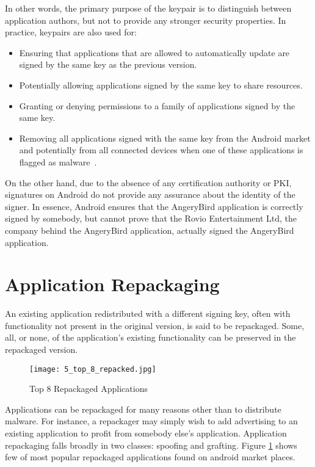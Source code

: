 In other words, the primary purpose of the keypair is to distinguish between application authors, but not to provide any stronger security properties. In practice, keypairs are also used for:
\begin{itemize}
\item Ensuring that applications that are allowed to automatically update are signed by the same key as the previous version.
\item Potentially allowing applications signed by the same key to share resources.
\item Granting or denying permissions to a family of applications signed by the same key.
\item Removing all applications signed with the same key from the Android market and potentially from all connected devices when one of these applications is flagged as malware~\cite{57}.
\end{itemize}

On the other hand, due to the absence of any certification authority or PKI, signatures on Android do not provide any assurance about the identity of the signer. In essence, Android ensures that the AngeryBird application is correctly signed by somebody, but cannot prove that the Rovio Entertainment Ltd, the company behind the AngeryBird application, actually signed the AngeryBird application.

\section{Application Repackaging}
\label{Application Repackaging}
An existing application redistributed with a different signing key, often with functionality not present in the original version, is said to be repackaged. Some, all, or none, of the application's existing functionality can be preserved in the repackaged version.

\begin{figure}[h]
\centering
\texttt{[image: 5\_top\_8\_repacked.jpg]}
\caption{Top 8 Repackaged Applications}
\label{fig:5_top_8_repacked}
\end{figure}

Applications can be repackaged for many reasons other than to distribute malware. For instance, a repackager may simply wish to
add advertising to an existing application to profit from somebody else's application. Application repackaging falls broadly in two
classes: spoofing and grafting. Figure \ref{fig:5_top_8_repacked} shows few of most popular repackaged applications found on android market places.

